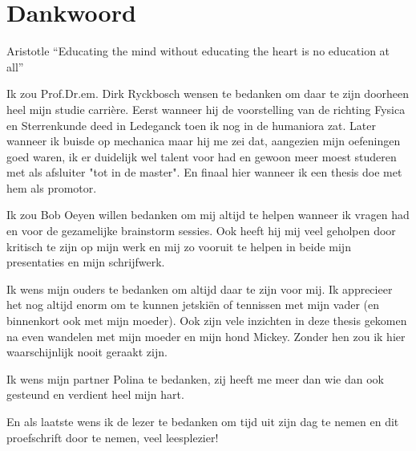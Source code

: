 \chapter*{Dankwoord}
\begin{chapquote}{Aristotle}
``Educating the mind without educating the heart is no education at all''
\end{chapquote}
Ik zou Prof.Dr.em. Dirk Ryckbosch wensen te bedanken om daar te zijn doorheen
heel mijn studie carrière. Eerst wanneer hij de voorstelling van de richting
Fysica en Sterrenkunde deed in Ledeganck toen ik nog in de humaniora zat. Later wanneer ik buisde op
mechanica maar hij me zei dat, aangezien mijn oefeningen goed waren, ik er
duidelijk wel talent voor had en gewoon meer moest studeren met als afsluiter
"tot in de master". En finaal hier wanneer ik een thesis doe met hem als
promotor.

Ik zou Bob Oeyen willen bedanken om mij altijd te helpen wanneer ik
vragen had en voor de gezamelijke brainstorm sessies. 
Ook heeft hij mij veel geholpen door kritisch te zijn op
mijn werk en mij zo vooruit te helpen in beide mijn presentaties en
mijn schrijfwerk.

Ik wens mijn ouders te bedanken om altijd daar te zijn voor mij.
Ik apprecieer het nog altijd enorm om te kunnen jetskiën of
tennissen met mijn vader (en binnenkort ook met mijn moeder).
Ook zijn vele inzichten in deze thesis gekomen na even wandelen
met mijn moeder en mijn hond Mickey.  Zonder hen zou ik hier
waarschijnlijk nooit geraakt zijn.

Ik wens mijn partner Polina te bedanken, zij
heeft me meer dan wie dan ook gesteund en verdient heel mijn
hart.

En als laatste wens ik de lezer te bedanken om tijd uit zijn 
dag te nemen en dit proefschrift door te nemen, veel leesplezier! 
